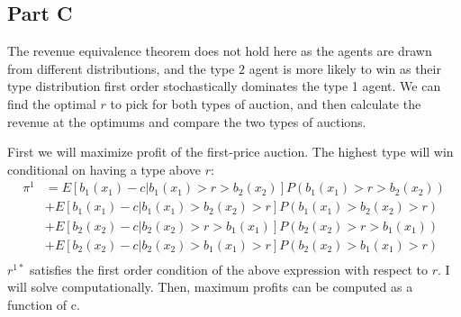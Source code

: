 \documentclass[11pt]{article} %
\begin{document}
\subsection{Part C}
The revenue equivalence theorem does not hold here as the agents are drawn from different distributions, and the type $2$ agent is more likely to win as their type distribution first order stochastically dominates the type 1 agent. We can find the optimal $r$ to pick for both types of auction, and then calculate the revenue at the optimums and compare the two types of auctions.

First we will maximize profit of the first-price auction. The highest type will win conditional on having a type above $r$:
\begin{align*}
\pi^1 &= E[b_1(x_1) - c| b_1(x_1)>r>b_2(x_2)]P(b_1(x_1)>r>b_2(x_2)) \\&+ E[b_1(x_1) - c|b_1(x_1)>b_2(x_2)>r]P(b_1(x_1)>b_2(x_2)>r) \\&+ E[b_2(x_2) - c|b_2(x_2)>r>b_1(x_1) ]P(b_2(x_2)>r>b_1(x_1)) \\&+ E[b_2(x_2) - c|b_2(x_2)>b_1(x_1)>r ]P(b_2(x_2)>b_1(x_1)>r)\\
\end{align*}
$r^{1*}$ satisfies the first order condition of the above expression with respect to $r$. I will solve computationally. Then, maximum profits can be computed as a function of c.
\end{document}
